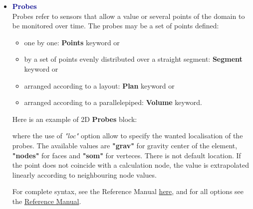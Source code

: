\begin{itemize}
\item \textcolor{darkblue}{\textbf{Probes}}\\
Probes refer to sensors that allow a value or several points of the domain to be monitored over time.
The probes may be a set of points defined:
\begin{itemize}
\item one by one: \textbf{Points} keyword or 
\item by a set of points evenly distributed over a straight segment: \textbf{Segment} keyword or
\item arranged according to a layout: \textbf{Plan} keyword or
\item arranged according to a parallelepiped: \textbf{Volume} keyword.
\end{itemize}

Here is an example of 2D \textbf{Probes} block:
    \begin{center}
    \end{center}
where the use of \textit{"loc"} option allow to specify the wanted localisation of the probes. The available values are \textbf{"grav"} for gravity center of the element, \textbf{"nodes"} for faces and \textbf{"som"} for verteces. There is not default location. If the point does not coincide with a calculation node, the value is extrapolated linearly according to neighbouring node values.

For complete syntax, see the \trust Reference Manual \href{TRUST_Reference_Manual.pdf\#corpspostraitement}{here}, and for all options see the \href{TRUST_Reference_Manual.pdf\#sondes}{\trust Reference Manual}.



\end{itemize}
